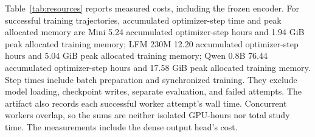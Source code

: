 Table~\ref{tab:resources} reports measured costs, including the frozen encoder. For successful training trajectories, accumulated optimizer-step time and peak allocated memory are Mini 5.24 accumulated optimizer-step hours and 1.94 GiB peak allocated training memory; LFM 230M 12.20 accumulated optimizer-step hours and 5.04 GiB peak allocated training memory; Qwen 0.8B 76.44 accumulated optimizer-step hours and 17.58 GiB peak allocated training memory. Step times include batch preparation and synchronized training. They exclude model loading, checkpoint writes, separate evaluation, and failed attempts. The artifact also records each successful worker attempt's wall time. Concurrent workers overlap, so the sums are neither isolated GPU-hours nor total study time. The measurements include the dense output head's cost.
